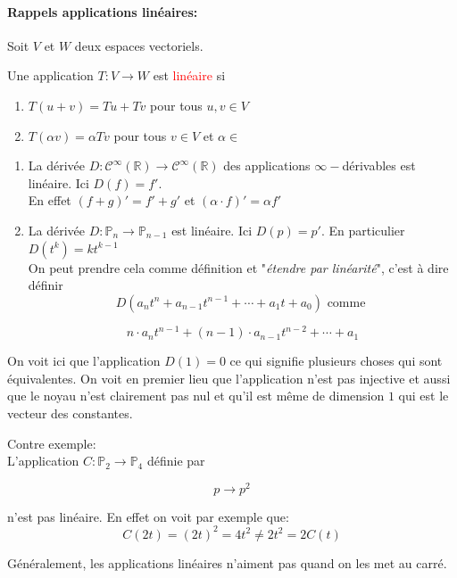 \paragraph{Rappels applications linéaires:}
Soit $V$ et $W$ deux espaces vectoriels.
\begin{definition}
    Une application $T : V \to W$ est \textcolor{red}{linéaire} si
    \begin{enumerate}
        \item $T(u + v) = Tu + Tv$ pour tous $u, v \in V$
        \item $T(\alpha v) = \alpha Tv$ pour tous $v \in V$ et $\alpha \in $\R
    \end{enumerate}
\end{definition}
\begin{exemple}
    \begin{enumerate}
        \item La dérivée $D : \mathcal{C}^\infty(\mathbb{R}) \to \mathcal{C}^\infty(\mathbb{R}) $ des applications $\infty-$dérivables est linéaire. Ici $D(f) = f'$.
        \\
        En effet $(f+g)' = f' + g'$ et $(\alpha\cdot f)' = \alpha f'$
        \item La dérivée $D : \mathbb{P}_n \to \mathbb{P}_{n-1}$ est linéaire. Ici $D(p) = p'$. En particulier $D(t^k) = kt^{k-1}$
        \\
        On peut prendre cela comme définition et "\textit{étendre par linéarité}", c'est à dire définir
        \[D(a_nt^n + a_{n-1}t^{n-1} + \cdots + a_1t + a_0) \text{ comme }\]
        \begin{formule}
            \[n\cdot a_n t^{n-1} + (n-1)\cdot a_{n-1}t^{n-2} + \cdots + a_1 \]
        \end{formule}
    \end{enumerate}
    \begin{framedremark}
        On voit ici que l'application $D(1) = 0$ ce qui signifie plusieurs choses qui sont équivalentes. On voit en premier lieu que l'application n'est pas injective et aussi que le noyau n'est clairement pas nul et qu'il est même de dimension $1$ qui est le vecteur des constantes.
    \end{framedremark}

    Contre exemple:
    \\ 
    L'application $C : \mathbb{P}_2 \to \mathbb{P}_4$ définie par 
    \begin{formule}
    \[p \to p^2\]
    \end{formule}
    n'est pas linéaire. En effet on voit par exemple que:
    \[C(2t) = (2t)^2 = 4t^2 \neq 2t^2 = 2C(t)\]
    \begin{framedremark}
        Généralement, les applications linéaires n'aiment pas quand on les met au carré.
    \end{framedremark}
\end{exemple}



